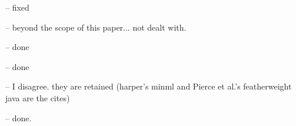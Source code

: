 
-- fixed


-- beyond the scope of this paper... not dealt with.



-- done


-- done


-- I disagree. they are retained (harper's minml and Pierce et al.'s featherweight java are the cites)


-- done.




